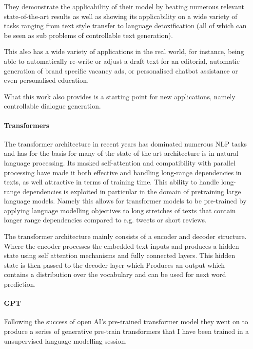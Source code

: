 They demonstrate the applicability of their model by beating numerous relevant state-of-the-art results as well as showing its applicability on a wide variety of tasks ranging from text style transfer to language detoxification (all of which can be seen as sub problems of controllable text generation). 

This also has a wide variety of applications in the real world, for instance, being able to automatically re-write or adjust a draft text for an editorial, automatic generation of brand specific vacancy ads, or personalised chatbot assistance or even personalised education.

What this work also provides is a starting point for new applications, namely controllable dialogue generation.


\paragraph{Transformers}

The transformer architecture in recent years has dominated numerous NLP tasks and has for the basis for many of the state of the art architecture is in natural language processing. Its masked self-attention and compatibility with parallel processing have made it both effective and handling long-range dependencies in texts, as well attractive in terms of training time. This ability to handle long-range dependencies is exploited in particular in the domain of pretraining large language models. Namely this allows for transformer models to be pre-trained by applying language modelling objectives to long stretches of texts that contain longer range dependencies compared to e.g. tweets or short reviews. 

The transformer architecture mainly consists of a encoder and decoder structure. Where the encoder processes the embedded text inputs and produces a hidden state using self attention mechanisms and fully connected layers. This hidden state is then passed to the decoder layer which Produces an output which contains a distribution over the vocabulary and can be used for next word prediction.

\paragraph{GPT}

Following the success of open AI's pre-trained transformer model they went on to produce a series of generative pre-train transformers that I have been trained in a unsupervised language modelling session.

